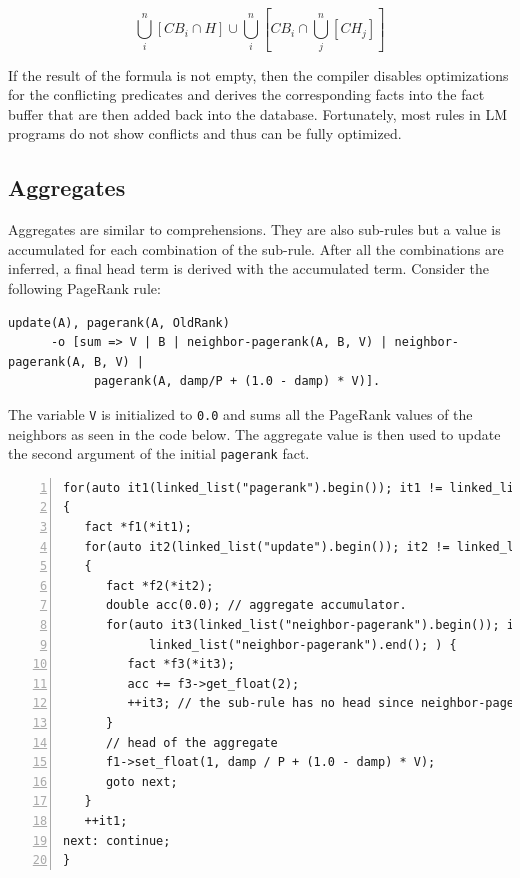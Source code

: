 \[
\bigcup^{n}_i[CB_i \cap H] \cup \bigcup^{n}_i [CB_i \cap \bigcup^{n}_j[CH_j]]
\]

If the result of the formula is not empty, then the compiler disables
optimizations for the conflicting predicates and derives the corresponding facts
into the fact buffer that are then added back into the database.
Fortunately, most rules in LM programs do not show conflicts and thus
can be fully optimized.

\subsection{Aggregates}

Aggregates are similar to comprehensions. They are also sub-rules but a value is
accumulated for each combination of the sub-rule. After all the combinations are
inferred, a final head term is derived with the accumulated term. Consider the following
PageRank rule:

\begin{Verbatim}[fontsize=\scriptsize]
update(A), pagerank(A, OldRank)
      -o [sum => V | B | neighbor-pagerank(A, B, V) | neighbor-pagerank(A, B, V) |
            pagerank(A, damp/P + (1.0 - damp) * V)].
\end{Verbatim}

The variable \texttt{V} is initialized to \texttt{0.0} and sums all
the PageRank values of the neighbors as seen in the code below. The aggregate
value is then used to update the second argument of the initial
\texttt{pagerank} fact.

\begin{Verbatim}[numbers=left,fontsize=\scriptsize]
for(auto it1(linked_list("pagerank").begin()); it1 != linked_list("pagerank").end(); )
{
   fact *f1(*it1);
   for(auto it2(linked_list("update").begin()); it2 != linked_list("update").end(); )
   {
      fact *f2(*it2);
      double acc(0.0); // aggregate accumulator.
      for(auto it3(linked_list("neighbor-pagerank").begin()); it3 !=
            linked_list("neighbor-pagerank").end(); ) {
         fact *f3(*it3);
         acc += f3->get_float(2);
         ++it3; // the sub-rule has no head since neighbor-pagerank is re-derived
      }
      // head of the aggregate
      f1->set_float(1, damp / P + (1.0 - damp) * V);
      goto next;
   }
   ++it1;
next: continue;
}
\end{Verbatim}
